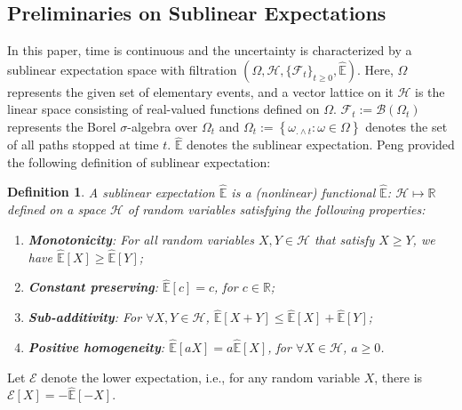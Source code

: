 \documentclass[onecolumn, journal]{IEEEtran} %
\begin{document}
	\subsection{Preliminaries on Sublinear Expectations}
	In this paper, time is continuous and the uncertainty is characterized by a sublinear expectation space with filtration $(\Omega, \mathcal{H}, \{\mathcal{F}_t\}_{t \geq 0}, \hat{\mathbb{E}})$. Here, $\Omega$ represents the given set of elementary events, and a vector lattice on it $\mathcal{H}$ is the linear space consisting of real-valued functions defined on $\Omega$. $\mathcal{F}_t := \mathcal{B}(\Omega_t)$ represents the Borel \(\sigma\)-algebra over $\Omega_t$ and $\Omega_t := \left\{ \omega_{.\wedge t} : \omega \in \Omega \right\}$ denotes the set of all paths stopped at time $t$.
	$\hat{\mathbb{E}}$ denotes the sublinear expectation. Peng \cite{peng2010nonlinear} provided the following definition of sublinear expectation:
	\newtheorem{definition}{Definition}
	\begin{definition}
		A sublinear expectation $\hat{\mathbb{E}}$ is a (nonlinear) functional $\hat{\mathbb{E}}$: $\mathcal{H} \mapsto \mathbb{R}$ defined on a space $\mathcal{H}$ of random variables satisfying the following properties: 
		\begin{enumerate}
			\item[(i)] \textbf{Monotonicity}: For all random variables $X, Y \in \mathcal{H}$ that satisfy $X \geq Y$, we have $\hat{\mathbb{E}}[X] \geq \hat{\mathbb{E}}[Y]$;
			\item[(ii)] \textbf{Constant preserving}: $\hat{\mathbb{E}}[c] = c$, for $c \in \mathbb{R}$;
			\item[(iii)] \textbf{Sub-additivity}: For $\forall X, Y \in \mathcal{H}$, $\hat{\mathbb{E}}[X + Y] \leq \hat{\mathbb{E}}[X] + \hat{\mathbb{E}}[Y]$;
			\item[(iv)] \textbf{Positive homogeneity}: $\hat{\mathbb{E}}[aX] = a\hat{\mathbb{E}}[X]$, for  $\forall X\in \mathcal{H}$, $a \geq 0$.
		\end{enumerate}
	\end{definition}
	Let $\mathcal{E}$ denote the lower expectation, i.e., for any random variable $X$, there is $\mathcal{E}[X] = -\hat{\mathbb{E}}[-X]$.
	
\end{document}
